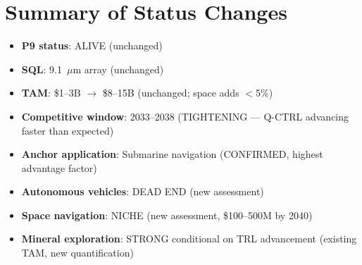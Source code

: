 \documentclass[11pt]{article}
\theoremstyle{definition}
\theoremstyle{remark}
\begin{document}
\section{Summary of Status Changes}

\begin{itemize}[nosep]
  \item \textbf{P9 status}: ALIVE (unchanged)
  \item \textbf{SQL}: 9.1~$\mu$m array (unchanged)
  \item \textbf{TAM}: \$1--3B $\to$ \$8--15B (unchanged;
    space adds $<$5\%)
  \item \textbf{Competitive window}: 2033--2038 (TIGHTENING ---
    Q-CTRL advancing faster than expected)
  \item \textbf{Anchor application}: Submarine navigation
    (CONFIRMED, highest advantage factor)
  \item \textbf{Autonomous vehicles}: DEAD END (new assessment)
  \item \textbf{Space navigation}: NICHE (new assessment,
    \$100--500M by 2040)
  \item \textbf{Mineral exploration}: STRONG conditional
    on TRL advancement (existing TAM, new quantification)
\end{itemize}
\end{document}
